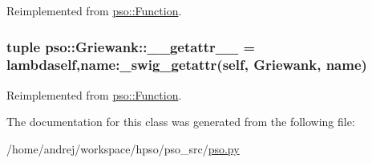 Reimplemented from \hyperlink{classpso_1_1Function_5bddc07dbaab0ee579488bdcc8103a71}{pso::Function}.\hypertarget{classpso_1_1Griewank_b73317e69a180eba6bef09b0317293be}{
\subsubsection{\setlength{\rightskip}{0pt plus 5cm}tuple {\bf pso::Griewank::\_\-\_\-getattr\_\-\_\-} = lambdaself,name:\_\-swig\_\-getattr(self, {\bf Griewank}, name)}}
\label{classpso_1_1Griewank_b73317e69a180eba6bef09b0317293be}




Reimplemented from \hyperlink{classpso_1_1Function_affeed856b337656e88895fa35321496}{pso::Function}.

The documentation for this class was generated from the following file:\begin{CompactItemize}
\item 
/home/andrej/workspace/hpso/pso\_\-src/\hyperlink{pso_8py}{pso.py}\end{CompactItemize}
